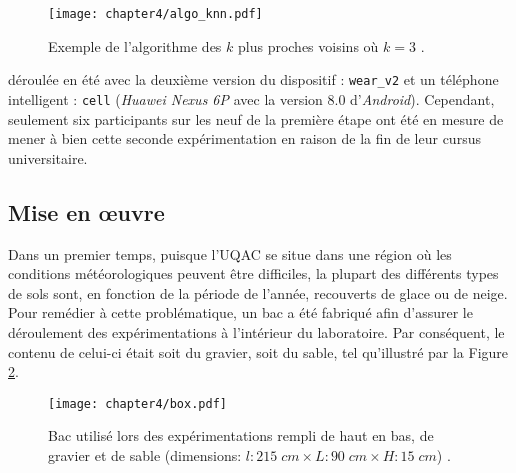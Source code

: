 \begin{figure}[H]
	\centering
	\texttt{[image: chapter4/algo\_knn.pdf]}
        \caption[Exemple de l'algorithme des $k$ plus proches voisins où $k=3$.]{Exemple de l'algorithme des $k$ plus proches voisins où $k=3$ \citep{Thullier2017}.}
	\label{fig:algo_knn}
\end{figure}

\noindent déroulée en été avec la deuxième version du dispositif : \texttt{wear\_v2} et un téléphone intelligent : \texttt{cell} (\textit{Huawei Nexus 6P} avec la version $8.0$ d'\textit{Android}). Cependant, seulement six participants sur les neuf de la première étape ont été en mesure de mener à bien cette seconde expérimentation en raison de la fin de leur cursus universitaire.

\subsection{Mise en \oe{}uvre}

Dans un premier temps, puisque l'\acs{UQAC} se situe dans une région où les conditions météorologiques peuvent être difficiles, la plupart des différents types de sols sont, en fonction de la période de l'année, recouverts de glace ou de neige. Pour remédier à cette problématique, un bac a été fabriqué afin d'assurer le déroulement des expérimentations à l'intérieur du laboratoire. Par conséquent, le contenu de celui-ci était soit du gravier, soit du sable, tel qu'illustré par la Figure \ref{fig:box}.

\begin{figure}[H]
	\centering
	\texttt{[image: chapter4/box.pdf]}
        \caption[Bac utilisé lors des expérimentations rempli de haut en bas, de gravier et de sable (dimensions: $l : 215\; cm \times L : 90\; cm \times H : 15\; cm$).]{Bac utilisé lors des expérimentations rempli de haut en bas, de gravier et de sable (dimensions: $l : 215\; cm \times L : 90\; cm \times H : 15\; cm$) \citep{Thullier2017}.}
	\label{fig:box}
\end{figure}

